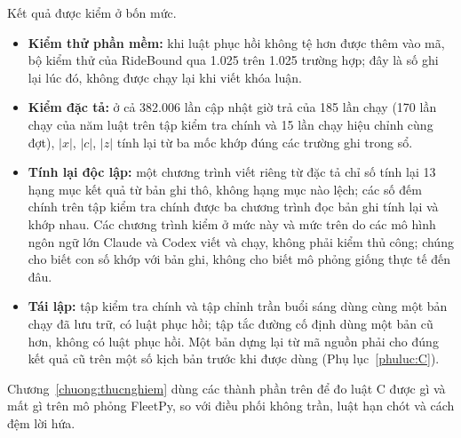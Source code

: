 Kết quả được kiểm ở bốn mức.
\begin{itemize}[leftmargin=1.2cm,itemsep=2pt,topsep=3pt]
\item \textbf{Kiểm thử phần mềm:} khi luật phục hồi không tệ hơn được thêm vào mã, bộ kiểm thử của
RideBound qua 1.025 trên 1.025 trường hợp; đây là số ghi lại lúc đó, không được chạy lại khi viết khóa
luận.
\item \textbf{Kiểm đặc tả:} ở cả 382.006 lần cập nhật giờ trả của 185 lần chạy (170 lần chạy của năm luật
trên tập kiểm tra chính và 15 lần chạy hiệu chỉnh cùng đợt), $|x|$, $|c|$, $|z|$ tính lại từ ba mốc khớp
đúng các trường ghi trong sổ.
\item \textbf{Tính lại độc lập:} một chương trình viết riêng từ đặc tả chỉ số tính lại 13 hạng mục kết quả
từ bản ghi thô, không hạng mục nào lệch; các số đếm chính trên tập kiểm tra chính được ba chương trình đọc
bản ghi tính lại và khớp nhau. Các chương trình kiểm ở mức này và mức trên do các mô hình ngôn ngữ lớn
Claude và Codex viết và chạy, không phải kiểm thủ công; chúng cho biết con số khớp với bản ghi, không cho
biết mô phỏng giống thực tế đến đâu.
\item \textbf{Tái lập:} tập kiểm tra chính và tập chỉnh trần buổi sáng dùng cùng một bản chạy đã lưu trữ,
có luật phục hồi; tập tắc đường cố định dùng một bản cũ hơn, không có luật phục hồi. Một bản dựng lại từ
mã nguồn phải cho đúng kết quả cũ trên một số kịch bản trước khi được dùng (Phụ lục~\ref{phuluc:C}).
\end{itemize}

Chương~\ref{chuong:thucnghiem} dùng các thành phần trên để đo luật C được gì và mất gì trên mô phỏng
FleetPy, so với điều phối không trần, luật hạn chót và cách đệm lời hứa.

